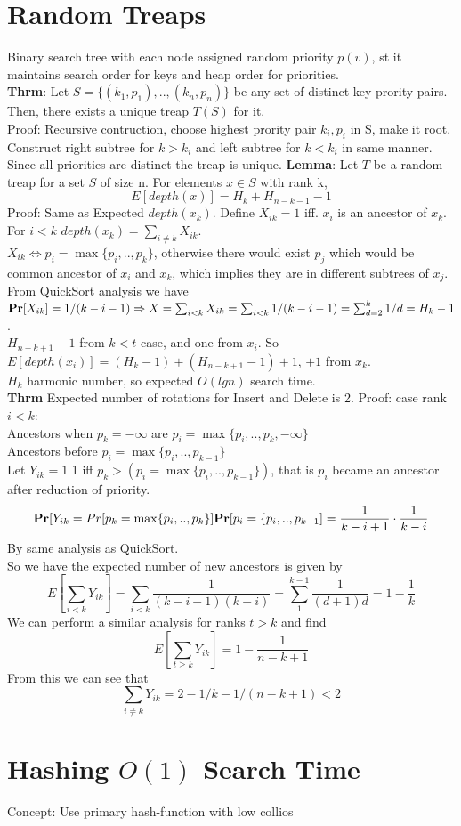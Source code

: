 \documentclass[a4paper]{article}
\def\Pr{\mbox{\textbf{Pr}}}
\begin{document}
\section{Random Treaps}
Binary search tree with each node assigned random priority \(p(v)\), st it  maintains search order for keys and heap order for priorities.\\
\textbf{Thrm}: Let \(S=\{(k_1,p_1),..,(k_n,p_n)\}\) be any set of distinct key-prority pairs. Then, there exists a unique treap \(T(S)\) for it.\\
Proof: Recursive contruction, choose highest prority pair \(k_i,p_i\) in S, make it root. Construct right subtree for \(k > k_i\) and left subtree for \(k < k_i\) in same manner. Since all priorities are distinct the treap is unique.
\textbf{Lemma}: Let \(T\) be a random treap for a set \(S\) of size n. For elements \(x \in S\) with rank k,
\[E[depth(x)] = H_k+H_{n-k-1} - 1\]
Proof:
Same as Expected \(depth(x_k)\). Define \(X_{ik} = 1\) iff. \(x_i\) is an ancestor of \(x_k\).\\
For \(i < k\) \(depth(x_k)=\sum_{i\neq k}X_{ik}\).\\
 \(X_{ik} \Leftrightarrow p_i = \max \{p_i,..,p_k\}\), otherwise there would exist \(p_j\) which would be common ancestor of \(x_i\) and \(x_k\), which implies they are in different subtrees of \(x_j\).\\
From QuickSort analysis we have \(\Pr[X_{ik}] = 1/(k-i-1) \Rightarrow X=\sum_{i<k} X_{ik} = \sum_{i<k} 1/(k-i-1) = \sum_{d=2}^k 1/d = H_k -1\). \\
\(H_{n-k+1} -1\) from \(k<t\) case, and one from \(x_i\). So \(E[depth(x_i)] = (H_k - 1)+(H_{n-k+1} -1) +1\), \(+1\) from \(x_k\). \\
\(H_k\) harmonic number, so expected \(O(lg n)\) search time. \\ 
\textbf{Thrm} Expected number of rotations for Insert and Delete is 2.
Proof: case rank \(i<k\):\\
Ancestors when \(p_k=-\infty\) are \(p_i = \max \{p_i,..,p_k,-\infty\}\)\\
Ancestors before \(p_i = \max\{p_i,..,p_{k-1}\}\)\\
Let \(Y_{ik}=1\) 1 iff \(p_k > (p_i = \max\{p_i,..,p_{k-1}\})\), that is \(p_i\) became an ancestor after reduction of priority.
\[\Pr[Y_{ik} = Pr[p_k= \max \{p_i,..,p_k\}]\Pr[p_i = \{p_i,..,p_{k-1}] = \frac{1}{k-i+1}\cdot\frac{1}{k-i}\]
By same analysis as QuickSort.\\
So we have the expected number of new ancestors is given by
\[E[\sum_{i<k} Y_{ik}] = \sum_{i<k} \frac{1}{(k-i-1)(k-i)} = \sum_1^{k-1} \frac{1}{(d+1)d} = 1 - \frac{1}{k}\]
We can perform a similar analysis for ranks \(t > k\) and find
\[E[\sum_{t \geq k} Y_{ik}] = 1-\frac{1}{n-k+1}\]
From this we can see that
\[\sum_{i\neq k} Y_{ik} = 2 - 1/k - 1/(n-k+1) < 2\]

\section{Hashing \(O(1)\) Search Time}
Concept: Use primary hash-function with low collios
\end{document}
